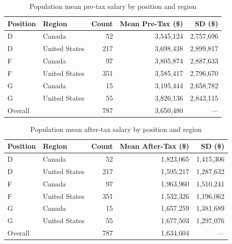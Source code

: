 \documentclass[12pt]{article}
\begin{document}
\begin{table}[H]
\centering
\caption{Population mean pre-tax salary by position and region}
\label{tab:pop_pretax}
\begin{tabular}{llrrr}
\toprule
Position & Region & Count & Mean Pre-Tax (\$) & SD (\$) \\
\midrule
D & Canada        &  52 & 3{,}545{,}124 & 2{,}757{,}696 \\
D & United States & 217 & 3{,}698{,}438 & 2{,}899{,}817 \\
F & Canada        &  97 & 3{,}805{,}874 & 2{,}887{,}633 \\
F & United States & 351 & 3{,}585{,}417 & 2{,}796{,}670 \\
G & Canada        &  15 & 3{,}195{,}444 & 2{,}658{,}782 \\
G & United States &  55 & 3{,}826{,}136 & 2{,}843{,}115 \\
\midrule
Overall           & & 787 & 3{,}650{,}480 & --- \\
\bottomrule
\end{tabular}
\end{table}

\begin{table}[H]
\centering
\caption{Population mean after-tax salary by position and region}
\label{tab:pop_aftertax}
\begin{tabular}{llrrr}
\toprule
Position & Region & Count & Mean After-Tax (\$) & SD (\$) \\
\midrule
D & Canada        &  52 & 1{,}823{,}065 & 1{,}415{,}306 \\
D & United States & 217 & 1{,}595{,}217 & 1{,}287{,}632 \\
F & Canada        &  97 & 1{,}963{,}960 & 1{,}510{,}241 \\
F & United States & 351 & 1{,}532{,}326 & 1{,}196{,}062 \\
G & Canada        &  15 & 1{,}657{,}259 & 1{,}381{,}689 \\
G & United States &  55 & 1{,}677{,}503 & 1{,}297{,}076 \\
\midrule
Overall           & & 787 & 1{,}634{,}604 & --- \\
\bottomrule
\end{tabular}
\end{table}
\end{document}
